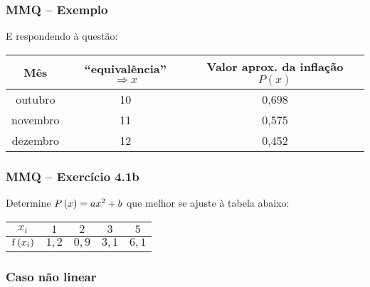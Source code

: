\begin{frame}
\frametitle{MMQ -- Exemplo}
E respondendo à questão:

\begin{tabular}{c|c|c}
\hline
Mês & ``equivalência'' $\Rightarrow x$ & Valor aprox. da inflação $P\left(x\right)$\\
\hline
outubro & 10 & 0,698 \\
\hline
novembro & 11 & 0,575 \\
\hline
dezembro & 12 & 0,452 \\
\hline
\end{tabular}
\end{frame}

\begin{frame}
\frametitle{MMQ -- Exercício 4.1b}

Determine $P \left(x\right) = a x^2 + b$ que melhor se ajuste à tabela abaixo:

\begin{center}
\begin{tabular}{|c|c|c|c|c|}
\hline
$x_i$ & $1$ & $2$ & $3$ & $5$\\
\hline
$\mathrm{f}\left(x_i\right)$ & $1,2$ & $0,9$ & $3,1$ & $6,1$\\
\hline 
\end{tabular}
\end{center}

\end{frame}

\begin{frame}
\frametitle{Caso não linear}
\end{frame}